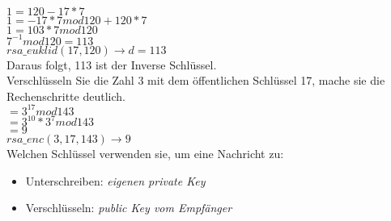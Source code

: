 $1=120-17*7$\\
$1=-17*7mod120 + 120 * 7$\\
$1=103*7mod120$\\
$7^{-1}mod120=113$\\

$rsa\_euklid(17,120) \rightarrow d=113$\\

Daraus folgt, 113 ist der Inverse Schlüssel.\\

Verschlüsseln Sie die Zahl 3 mit dem öffentlichen Schlüssel 17, mache sie die Rechenschritte deutlich.\\
$=3^{17}mod143$\\
$=3^{10}*3^7mod143$\\
$=9$\\

$rsa\_enc(3,17,143) \rightarrow 9$\\

Welchen Schlüssel verwenden sie, um eine Nachricht zu:\\
\begin{itemize}
    \item Unterschreiben: \textit{eigenen private Key}
    \item Verschlüsseln: \textit{public Key vom Empfänger}
\end{itemize}